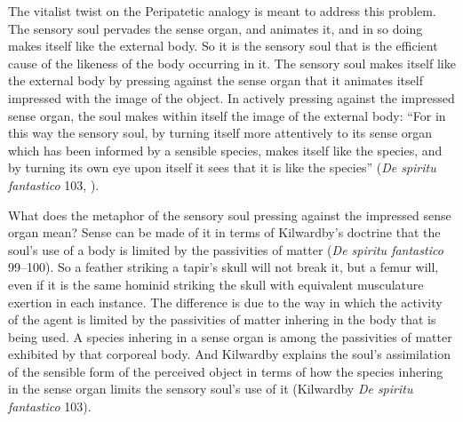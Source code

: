 The vitalist twist on the Peripatetic analogy is meant to address this problem. The sensory soul pervades the sense organ, and animates it, and in so doing makes itself like the external body. So it is the sensory soul that is the efficient cause of the likeness of the body occurring in it. The sensory soul makes itself like the external body by pressing against the sense organ that it animates itself impressed with the image of the object. In actively pressing against the impressed sense organ, the soul makes within itself the image of the external body: ``For in this way the sensory soul, by turning itself more attentively to its sense organ which has been informed by a sensible species, makes itself like the species, and by turning its own eye upon itself it sees that it is like the species'' (\emph{De spiritu fantastico} 103, \citealt[94]{Broadie:1993dz}).

What does the metaphor of the sensory soul pressing against the impressed sense organ mean? Sense can be made of it in terms of Kilwardby's doctrine that the soul's use of a body is limited by the passivities of matter (\emph{De spiritu fantastico} 99--100). So a feather striking a tapir's skull will not break it, but a femur will, even if it is the same hominid striking the skull with equivalent musculature exertion in each instance. The difference is due to the way in which the activity of the agent is limited by the passivities of matter inhering in the body that is being used. A species inhering in a sense organ is among the passivities of matter exhibited by that corporeal body. And Kilwardby explains the soul's assimilation of the sensible form of the perceived object in terms of how the species inhering in the sense organ limits the sensory soul's use of it (Kilwardby \emph{De spiritu fantastico} 103).

